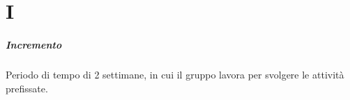 \chapter{I}

\paragraph*{Incremento}
Periodo di tempo di 2 settimane, in cui il gruppo lavora per svolgere le attività prefissate.